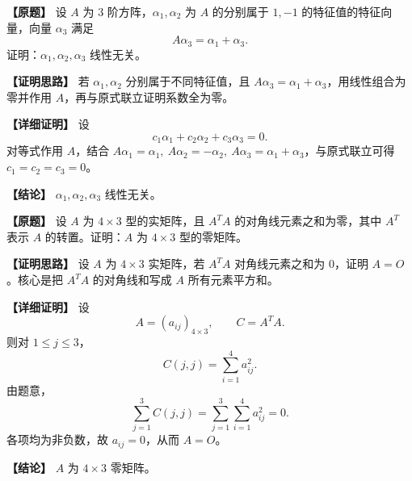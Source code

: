 \documentclass[11pt,a4paper,UTF8]{ctexart}
\begin{document}
\begin{answerbox}
\textbf{【原题】} 设 $A$ 为 $3$ 阶方阵，$\alpha_1,\alpha_2$ 为 $A$ 的分别属于 $1,-1$ 的特征值的特征向量，向量 $\alpha_3$ 满足
\[
A\alpha_3=\alpha_1+\alpha_3.
\]
证明：$\alpha_1,\alpha_2,\alpha_3$ 线性无关。

\textbf{【证明思路】} 若 $\alpha_1,\alpha_2$ 分别属于不同特征值，且 $A\alpha_3=\alpha_1+\alpha_3$，用线性组合为零并作用 $A$，再与原式联立证明系数全为零。

\textbf{【详细证明】} 设
\[
c_1\alpha_1+c_2\alpha_2+c_3\alpha_3=0.
\]
对等式作用 $A$，结合 $A\alpha_1=\alpha_1,\ A\alpha_2=-\alpha_2,\ A\alpha_3=\alpha_1+\alpha_3$，与原式联立可得 $c_1=c_2=c_3=0$。

\textbf{【结论】} $\alpha_1,\alpha_2,\alpha_3$ 线性无关。
\end{answerbox}

\begin{answerbox}
\textbf{【原题】} 设 $A$ 为 $4\times3$ 型的实矩阵，且 $A^TA$ 的对角线元素之和为零，其中 $A^T$ 表示 $A$ 的转置。证明：$A$ 为 $4\times3$ 型的零矩阵。

\textbf{【证明思路】} 设 $A$ 为 $4\times3$ 实矩阵，若 $A^TA$ 对角线元素之和为 $0$，证明 $A=O$。核心是把 $A^TA$ 的对角线和写成 $A$ 所有元素平方和。

\textbf{【详细证明】}
设
\[
A=(a_{ij})_{4\times3},\qquad C=A^TA.
\]
则对 $1\le j\le3$，
\[
C(j,j)=\sum_{i=1}^4 a_{ij}^2.
\]
由题意，
\[
\sum_{j=1}^3 C(j,j)=\sum_{j=1}^3\sum_{i=1}^4 a_{ij}^2=0.
\]
各项均为非负数，故 $a_{ij}=0$，从而 $A=O$。

\textbf{【结论】} $A$ 为 $4\times3$ 零矩阵。
\end{answerbox}
\end{document}
